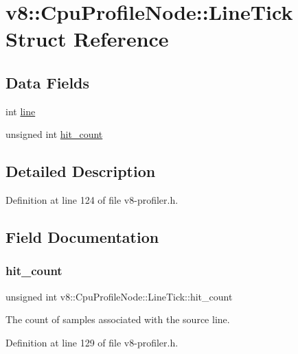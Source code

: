 \hypertarget{structv8_1_1CpuProfileNode_1_1LineTick}{}\section{v8\+:\+:Cpu\+Profile\+Node\+:\+:Line\+Tick Struct Reference}
\label{structv8_1_1CpuProfileNode_1_1LineTick}
\subsection*{Data Fields}
\begin{DoxyCompactItemize}
\item 
int \mbox{\hyperlink{structv8_1_1CpuProfileNode_1_1LineTick_af96fbdefbc07b2c84cf41d74555626f6}{line}}
\item 
unsigned int \mbox{\hyperlink{structv8_1_1CpuProfileNode_1_1LineTick_a62653fb1e6d381a5747d24b83aab1c1b}{hit\+\_\+count}}
\end{DoxyCompactItemize}


\subsection{Detailed Description}


Definition at line 124 of file v8-\/profiler.\+h.



\subsection{Field Documentation}
\mbox{\label{structv8_1_1CpuProfileNode_1_1LineTick_a62653fb1e6d381a5747d24b83aab1c1b}} 
\subsubsection{\texorpdfstring{hit\+\_\+count}{hit\_count}}
{\footnotesize\ttfamily unsigned int v8\+::\+Cpu\+Profile\+Node\+::\+Line\+Tick\+::hit\+\_\+count}

The count of samples associated with the source line. 

Definition at line 129 of file v8-\/profiler.\+h.

